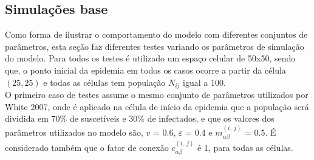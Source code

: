 \documentclass[a4paper,12pt]{article}
\begin{document}





\subsection{Simulações base}

Como forma de ilustrar o comportamento do modelo com diferentes conjuntos de parâmetros, esta seção faz diferentes testes variando os parâmetros de simulação do modelo. Para todos os testes é utilizado um espaço celular de 50x50, sendo que, o ponto inicial da epidemia em todos os casos ocorre a partir da célula $(25,25)$ e todas as células tem população $N_{ij}$ igual a 100.\\

O primeiro caso de testes assume o mesmo conjunto de parâmetros utilizados por White 2007\cite{White2007}, onde é aplicado na célula de início da epidemia que a população será dividida em 70\% de suscetíveis e 30\% de infectados, e que os valores dos parâmetros utilizados no modelo são, $v$ = 0.6, $\varepsilon$ = 0.4 e  $ m_{\alpha \beta}^{\left(i,\:j\right)}$ = 0.5. É considerado também que o fator de conexão $c_{\alpha \beta}^{\left(i,\:j\right)}$ é 1, para todas as células. 
\end{document}
